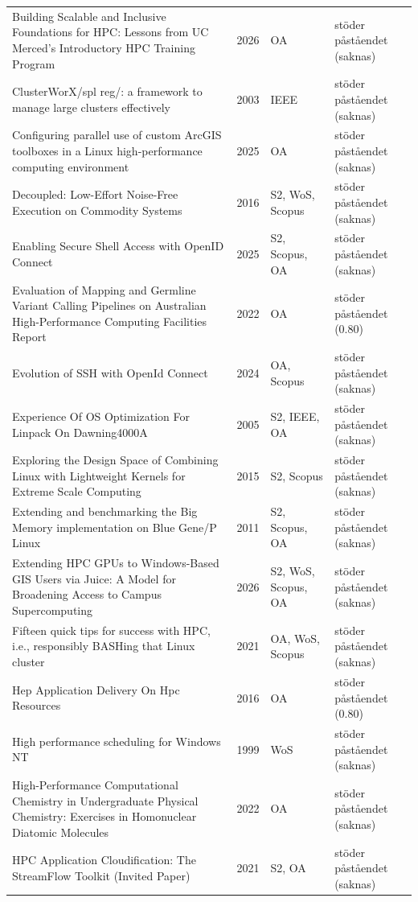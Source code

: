 \begin{longtable}{@{}%
  >{\raggedright\arraybackslash}p{}c%
  >{\raggedright\arraybackslash}p{}%
  >{\raggedright\arraybackslash}p{}@{}}
Building Scalable and Inclusive Foundations for HPC: Lessons from UC Merced's Introductory HPC Training Program & 2026 & OA & stöder påståendet (saknas) \\
ClusterWorX/spl reg/: a framework to manage large clusters effectively & 2003 & IEEE & stöder påståendet (saknas) \\
Configuring parallel use of custom ArcGIS toolboxes in a Linux high-performance computing environment & 2025 & OA & stöder påståendet (saknas) \\
Decoupled: Low-Effort Noise-Free Execution on Commodity Systems & 2016 & S2, WoS, Scopus & stöder påståendet (saknas) \\
Enabling Secure Shell Access with OpenID Connect & 2025 & S2, Scopus, OA & stöder påståendet (saknas) \\
Evaluation of Mapping and Germline Variant Calling Pipelines on Australian High-Performance Computing Facilities Report & 2022 & OA & stöder påståendet (0.80) \\
Evolution of SSH with OpenId Connect & 2024 & OA, Scopus & stöder påståendet (saknas) \\
Experience Of OS Optimization For Linpack On Dawning4000A & 2005 & S2, IEEE, OA & stöder påståendet (saknas) \\
Exploring the Design Space of Combining Linux with Lightweight Kernels for Extreme Scale Computing & 2015 & S2, Scopus & stöder påståendet (saknas) \\
Extending and benchmarking the \textquotedbl{}Big Memory\textquotedbl{} implementation on Blue Gene/P Linux & 2011 & S2, Scopus, OA & stöder påståendet (saknas) \\
Extending HPC GPUs to Windows-Based GIS Users via Juice: A Model for Broadening Access to Campus Supercomputing & 2026 & S2, WoS, Scopus, OA & stöder påståendet (saknas) \\
Fifteen quick tips for success with HPC, i.e., responsibly BASHing that Linux cluster & 2021 & OA, WoS, Scopus & stöder påståendet (saknas) \\
Hep Application Delivery On Hpc Resources & 2016 & OA & stöder påståendet (0.80) \\
High performance scheduling for Windows NT & 1999 & WoS & stöder påståendet (saknas) \\
High-Performance Computational Chemistry in Undergraduate Physical Chemistry: Exercises in Homonuclear Diatomic Molecules & 2022 & OA & stöder påståendet (saknas) \\
HPC Application Cloudification: The StreamFlow Toolkit (Invited Paper) & 2021 & S2, OA & stöder påståendet (saknas) \\

\end{longtable}
